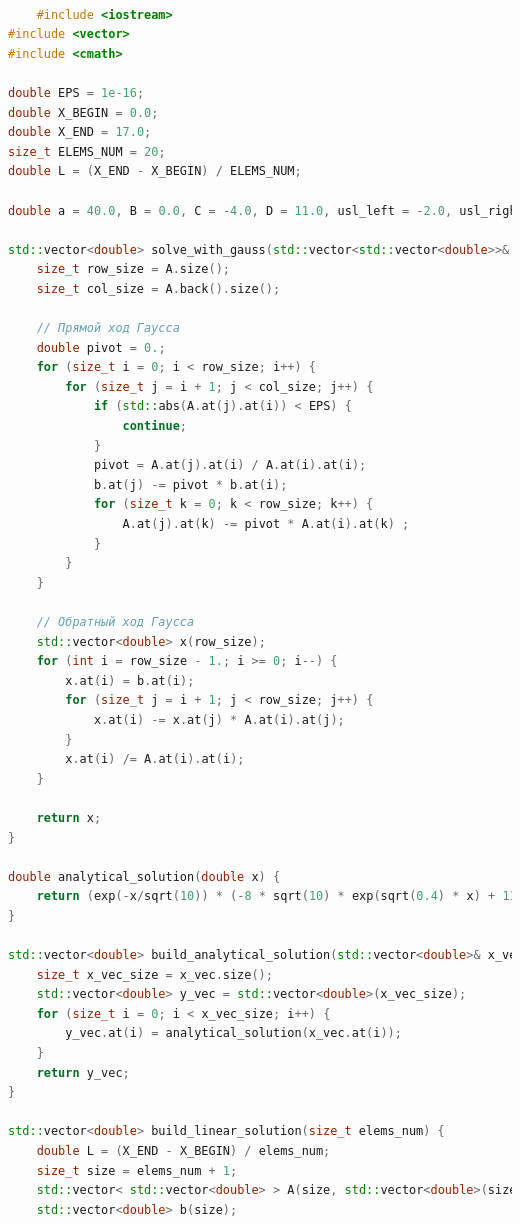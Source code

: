 \begin{lstlisting}[language=c++, label=prog,caption={\textit{Реализация МКЭ}}]

	#include <iostream>
#include <vector>
#include <cmath>

double EPS = 1e-16;
double X_BEGIN = 0.0;
double X_END = 17.0;
size_t ELEMS_NUM = 20;
double L = (X_END - X_BEGIN) / ELEMS_NUM;

double a = 40.0, B = 0.0, C = -4.0, D = 11.0, usl_left = -2.0, usl_right = 6.0; // au"+Bu'+Cu+D=0

std::vector<double> solve_with_gauss(std::vector<std::vector<double>>& A, std::vector<double>& b){
    size_t row_size = A.size();
    size_t col_size = A.back().size();

    // Прямой ход Гаусса
    double pivot = 0.;
    for (size_t i = 0; i < row_size; i++) {
        for (size_t j = i + 1; j < col_size; j++) {
            if (std::abs(A.at(j).at(i)) < EPS) {
                continue;
            }
            pivot = A.at(j).at(i) / A.at(i).at(i);
            b.at(j) -= pivot * b.at(i);
            for (size_t k = 0; k < row_size; k++) {
                A.at(j).at(k) -= pivot * A.at(i).at(k) ;
            }
        }
    }

    // Обратный ход Гаусса
    std::vector<double> x(row_size);
    for (int i = row_size - 1.; i >= 0; i--) {
        x.at(i) = b.at(i);
        for (size_t j = i + 1; j < row_size; j++) {
            x.at(i) -= x.at(j) * A.at(i).at(j);
        }
        x.at(i) /= A.at(i).at(i);
    }

    return x;
}

double analytical_solution(double x) {
    return (exp(-x/sqrt(10)) * (-8 * sqrt(10) * exp(sqrt(0.4) * x) + 11 * exp(x/sqrt(10)) + 11 * exp((x + 34.)/sqrt(10)) + 13 * exp((2. * x + 17)/sqrt(10)) + 8 * sqrt(10) * exp(17. * sqrt(0.4)) + 13. * exp(17./sqrt(10))))/(4. * (1. + exp(17. * sqrt(0.4))));
}

std::vector<double> build_analytical_solution(std::vector<double>& x_vec) {
    size_t x_vec_size = x_vec.size();
    std::vector<double> y_vec = std::vector<double>(x_vec_size);
    for (size_t i = 0; i < x_vec_size; i++) {
        y_vec.at(i) = analytical_solution(x_vec.at(i));
    }
    return y_vec;
}

std::vector<double> build_linear_solution(size_t elems_num) {
    double L = (X_END - X_BEGIN) / elems_num;
    size_t size = elems_num + 1;
    std::vector< std::vector<double> > A(size, std::vector<double>(size));
    std::vector<double> b(size);


\end{lstlisting}
